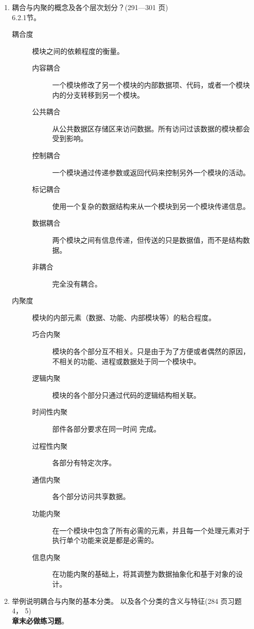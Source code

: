 \documentclass[14pt, letterpaper, UTF8, fontset=windowsnew, heading=true]{article}
\begin{document}
\begin{enumerate}
	\item 耦合与内聚的概念及各个层次划分？(291---301 页) \\
	6.2.1节。
	\begin{description}
		\item[耦合度] 模块之间的依赖程度的衡量。
			\begin{description}
				\item[内容耦合] 一个模块修改了另一个模块的内部数据项、代码，或者一个模块内的分支转移到另一个模块。
				\item[公共耦合] 从公共数据区存储区来访问数据。所有访问过该数据的模块都会受到影响。
				\item[控制耦合] 一个模块通过传递参数或返回代码来控制另外一个模块的活动。
				\item[标记耦合] 使用一个复杂的数据结构来从一个模块到另一个模块传递信息。
				\item[数据耦合] 两个模块之间有信息传递，但传送的只是数据值，而不是结构数据。
				\item[非耦合] 完全没有耦合。
			\end{description}
		\item[内聚度] 模块的内部元素（数据、功能、内部模块等）的粘合程度。
			\begin{description}
				\item[巧合内聚] 模块的各个部分互不相关。只是由于为了方便或者偶然的原因，不相关的功能、进程或数据处于同一个模块中。
				\item[逻辑内聚] 模块的各个部分只通过代码的逻辑结构相关联。
				\item[时间性内聚] 部件各部分要求在同一时间
				完成。
				\item[过程性内聚] 各部分有特定次序。
				\item[通信内聚] 各个部分访问共享数据。
				\item[功能内聚] 在一个模块中包含了所有必需的元素，并且每一个处理元素对于执行单个功能来说是都是必需的。
				\item[信息内聚] 在功能内聚的基础上，将其调整为数据抽象化和基于对象的设计。
			\end{description}
	\end{description}
	
	\item 举例说明耦合与内聚的基本分类。 以及各个分类的含义与特征(284 页习题 4， 5) \\
	\textbf{章末必做练习题}。

%
	

\end{enumerate}
\end{document}
